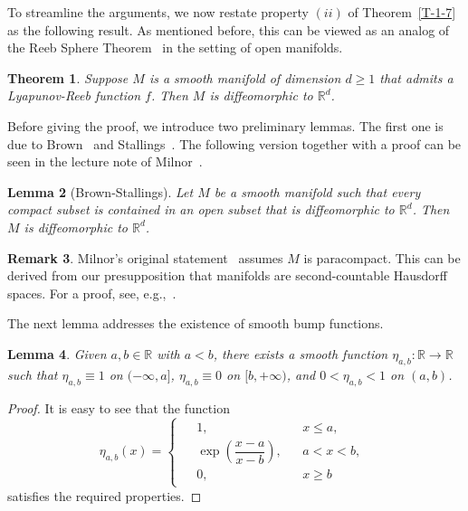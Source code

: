 \documentclass[11pt,letterpaper]{amsart}
\theoremstyle{plain}
\newtheorem{theorem}{Theorem}[section]
\newtheorem{lemma}[theorem]{Lemma}
\theoremstyle{definition}
\newtheorem{remark}[theorem]{Remark}
\theoremstyle{remark}
\numberwithin{equation}{section}
\begin{document}
To streamline the arguments, we now restate property $(ii)$ of Theorem~\ref{T-1-7} as the following result. As mentioned before, this can be viewed as an analog of the Reeb Sphere Theorem~\cite{Reeb-1946,Milnor-1964} in the setting of open manifolds.

\begin{theorem}\label{T-2-5}
Suppose $M$ is a smooth manifold of dimension $d\geq1$ that admits a Lyapunov-Reeb function $f$. Then $M$ is diffeomorphic to $\mathbb R^{d}$.
\end{theorem}

Before giving the proof, we introduce two preliminary lemmas. The first one is due to Brown~\cite{Brown-1961} and Stallings~\cite{Stallings-1962}. The following version together with a proof can be seen in the lecture note of Milnor~\cite[p.~168]{Milnor-1964}.
\begin{lemma}[Brown-Stallings]\label{L-2-6}
Let $M$ be a smooth manifold such that every compact subset is contained in an open subset that is diffeomorphic to $\mathbb{R}^d$. Then $M$ is diffeomorphic to $\mathbb{R}^d$.
\end{lemma}

\begin{remark}
Milnor's original statement~\cite[p.~168]{Milnor-1964} assumes $M$ is paracompact. This can be derived from our presupposition that manifolds are second-countable Hausdorff spaces. For a proof,  see, e.g.,~\cite[Theorem 1.15]{Lee-2018}.
\end{remark}


The next lemma addresses the existence of smooth bump functions.
\begin{lemma}\label{L-2-8}
Given $a,b\in \mathbb R$ with $a<b$, there exists a smooth function $\eta_{a,b}:\mathbb R\to\mathbb R$ such that $\eta_{a,b}\equiv1$ on $(-\infty,a]$, $\eta_{a,b}\equiv 0$ on $[b,+\infty)$, and $0<\eta_{a,b}<1$ on $(a,b)$.
\end{lemma}
\begin{proof}
It is easy to see that the function
\[
\eta_{a,b}(x)=
\begin{cases}
\begin{aligned}
&1, &&x\leq a,\\
&\exp\left(\dfrac{x-a}{x-b}\right), &&a<x<b,\\
&0, &&x\geq b
\end{aligned}
\end{cases}
\]
satisfies the required properties.
\end{proof}
\end{document}
